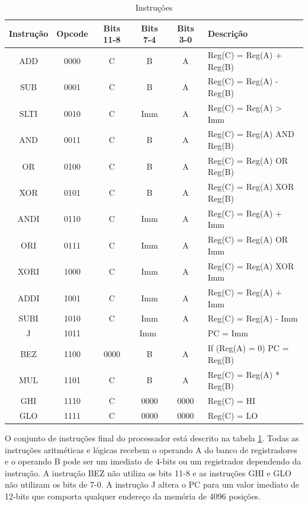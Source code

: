 \documentclass[11pt,a4paper,titlepage]{article}
\begin{document}
\begin{table}[!h]
\centering
\begin{tabular}{| c | c | c | c | c | l |}
\hline
Instrução & Opcode & Bits 11-8 & Bits 7-4 & Bits 3-0 & Descrição \\
\hline
\hline
 ADD  & 0000 & C & B & A   & Reg(C) = Reg(A) + Reg(B) \\
\hline
 SUB  & 0001 & C & B & A   & Reg(C) = Reg(A) - Reg(B) \\
\hline
 SLTI & 0010 & C & Imm & A & Reg(C) = Reg(A) > Imm \\
\hline
 AND  & 0011 & C & B & A   & Reg(C) = Reg(A) AND Reg(B) \\
\hline
 OR   & 0100 & C & B & A   & Reg(C) = Reg(A) OR Reg(B) \\
\hline
 XOR  & 0101 & C & B & A   & Reg(C) = Reg(A) XOR Reg(B) \\
\hline
 ANDI & 0110 & C & Imm & A & Reg(C) = Reg(A) + Imm \\
\hline
 ORI  & 0111 & C & Imm & A & Reg(C) = Reg(A) OR Imm \\
\hline
 XORI & 1000 & C & Imm & A & Reg(C) = Reg(A) XOR Imm \\
\hline
 ADDI & 1001 & C & Imm & A & Reg(C) = Reg(A) + Imm \\
\hline
 SUBI & 1010 & C & Imm & A & Reg(C) = Reg(A) - Imm \\
\hline
 J    & 1011 & \multicolumn{3}{c|}{Imm} & PC = Imm \\
\hline
 BEZ  & 1100 & 0000 & B & A   & If (Reg(A) = 0) PC = Reg(B) \\
\hline
 MUL  & 1101 & C & B & A   & Reg(C) = Reg(A) * Reg(B) \\
\hline
 GHI  & 1110 & C & 0000 & 0000   & Reg(C) = HI \\
\hline
 GLO  & 1111 & C & 0000 & 0000   & Reg(C) = LO \\
\hline
\end{tabular}
\caption{Instruções}
\label{tab:instructions}
\end{table}
%

O conjunto de instruções final do processador está descrito na tabela \ref{tab:instructions}.
Todas as instruções aritméticas e lógicas recebem o operando A do banco de registradores e o
operando B pode ser um imediato de 4-bits ou um registrador dependendo da instrução. A instrução
BEZ não utiliza os bits 11-8 e as instruções GHI e GLO não utilizam os bits de 7-0. A instrução
J altera o PC para um valor imediato de 12-bits que comporta qualquer endereço da memória de
4096 posições.
\end{document}
